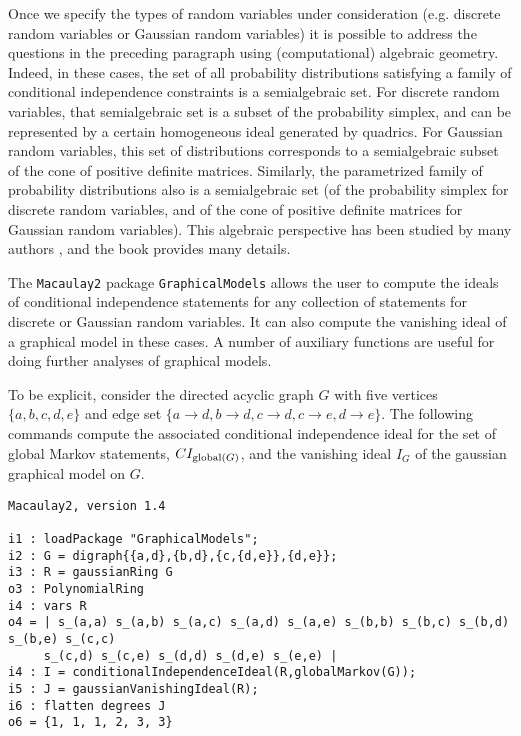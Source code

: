 \documentclass[letterpaper]{article}
\theoremstyle{plain}
\theoremstyle{definition}
\begin{document}
Once we specify the types of random variables under consideration
(e.g. discrete random variables or Gaussian random variables) it
is possible to address the questions in the preceding paragraph
using (computational) algebraic geometry.  Indeed, in these cases,
the set of all probability distributions satisfying a family of 
conditional independence constraints is a semialgebraic set.
For discrete random variables, that semialgebraic set is a subset
of the probability simplex, and can be represented by a certain
homogeneous ideal generated by quadrics.  For Gaussian random variables,
this set of distributions corresponds to a semialgebraic subset
of the cone of positive definite matrices.  Similarly,
the parametrized family of probability distributions also
is a semialgebraic set (of the probability simplex for discrete
random variables, and of the cone of positive definite matrices
for Gaussian random variables).  This algebraic perspective
has been studied by many authors %
\cite{ GSS, GMS, S}, and the book \cite{DSS}
provides many details.

The {\tt Macaulay2} package {\tt GraphicalModels} allows the user to compute
the ideals of conditional independence statements for any collection
of statements for discrete or Gaussian
random variables.  It can also compute the vanishing ideal of 
a graphical model in these cases.  A number of auxiliary functions
are useful for doing further analyses of graphical models.

To be explicit, consider the directed acyclic graph $G$ with  five
vertices $\{a,b,c,d,e\}$ and edge
set $\{a \to d, b \to d, c \to d, c \to e, d \to e\}$.
The following commands compute the associated conditional
independence ideal for the set of global Markov statements,
$CI_{{\rm global}(G)}$, and 
the vanishing ideal $I_{G}$ of the gaussian graphical model on $G$.


\begin{verbatim}
Macaulay2, version 1.4

i1 : loadPackage "GraphicalModels";
i2 : G = digraph{{a,d},{b,d},{c,{d,e}},{d,e}}; 
i3 : R = gaussianRing G
o3 : PolynomialRing
i4 : vars R
o4 = | s_(a,a) s_(a,b) s_(a,c) s_(a,d) s_(a,e) s_(b,b) s_(b,c) s_(b,d) s_(b,e) s_(c,c) 
     s_(c,d) s_(c,e) s_(d,d) s_(d,e) s_(e,e) |
i4 : I = conditionalIndependenceIdeal(R,globalMarkov(G));
i5 : J = gaussianVanishingIdeal(R);
i6 : flatten degrees J
o6 = {1, 1, 1, 2, 3, 3}
\end{verbatim}
\end{document}

